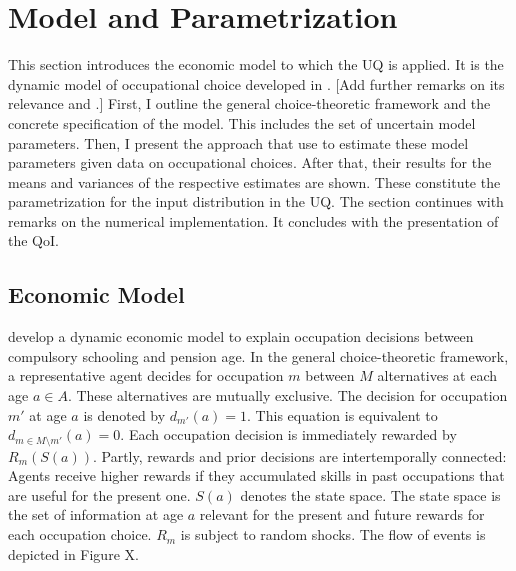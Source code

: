 \documentclass[a4paper,12pt]{article}
\begin{document}
\section{Model and Parametrization}
\thispagestyle{plain} %
This section introduces the economic model to which the UQ is applied. It is the dynamic model of occupational choice developed in \cite{Keane.1994}. [Add further remarks on its relevance and \cite{Keane.1997}.] First, I outline the general choice-theoretic framework and the concrete specification of the model. This includes the set of uncertain model parameters. Then, I present the approach that  \citeauthor{Keane.1997} use to estimate these model parameters given data on occupational choices. After that, their results for the means and variances of the respective estimates are shown. These constitute the parametrization for the input distribution in the UQ. The section continues with remarks on the numerical implementation. It concludes with the presentation of the QoI.


\subsection{Economic Model}

\cite{Keane.1994} develop a dynamic economic model to explain occupation decisions between compulsory schooling and pension age. In the general choice-theoretic framework, a representative agent decides for occupation $m$ between $M$ alternatives at each age $a \in A$. These alternatives are mutually exclusive. The decision for occupation $m'$ at age $a$ is denoted by $d_{m'}(a)=1$. This equation is equivalent to $d_{m \in M\setminus m'}(a)=0$. Each occupation decision is immediately rewarded by $R_m(S(a))$. Partly, rewards and prior decisions are intertemporally connected: Agents receive higher rewards if they accumulated skills in past occupations that are useful for the present one. $S(a)$ denotes the state space. The state space is the set of information at age $a$ relevant for the present and future rewards for each occupation choice. $R_m$ is subject to random shocks. The flow of events is depicted in Figure X. \\
\end{document}
